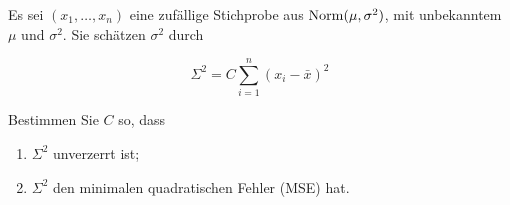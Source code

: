 
Es sei $(x_1, \dots, x_n)$ eine zuf\"allige Stichprobe aus
$\mathrm{Norm}(\mu, \sigma^2 )$, mit unbekanntem $\mu$ und $\sigma^2$.
Sie sch\"atzen $\sigma^2$ durch

\[ \Sigma^2 = C \sum^{n}_{i=1} \left( x_i - \bar{x} \right)^2\]

Bestimmen Sie $C$ so, dass
\begin{enumerate}
    \item $\Sigma^2$ unverzerrt ist;
    \item $\Sigma^2$ den minimalen quadratischen Fehler (MSE) hat.
\end{enumerate}


